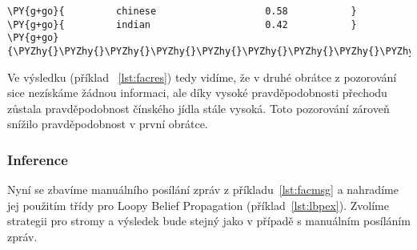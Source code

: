 \begin{example}
\begin{Verbatim}[commandchars=\\\{\}]
\PY{g+go}{         chinese                   0.58           }
\PY{g+go}{         indian                    0.42           }
\PY{g+go}{\PYZhy{}\PYZhy{}\PYZhy{}\PYZhy{}\PYZhy{}\PYZhy{}\PYZhy{}\PYZhy{}\PYZhy{}\PYZhy{}\PYZhy{}\PYZhy{}\PYZhy{}\PYZhy{}\PYZhy{}\PYZhy{}\PYZhy{}\PYZhy{}\PYZhy{}\PYZhy{}\PYZhy{}\PYZhy{}\PYZhy{}\PYZhy{}\PYZhy{}\PYZhy{}\PYZhy{}\PYZhy{}\PYZhy{}\PYZhy{}\PYZhy{}\PYZhy{}\PYZhy{}\PYZhy{}\PYZhy{}\PYZhy{}\PYZhy{}\PYZhy{}\PYZhy{}\PYZhy{}\PYZhy{}\PYZhy{}\PYZhy{}\PYZhy{}\PYZhy{}\PYZhy{}\PYZhy{}\PYZhy{}\PYZhy{}\PYZhy{}}
\end{Verbatim}
\caption{Výsledek inference}
\label{lst:facres}
\end{example}


Ve výsledku (příklad ~\ref{lst:facres}) tedy vidíme, že v druhé obrátce z pozorování sice nezískáme žádnou informaci, ale díky vysoké pravděpodobnosti přechodu zůstala pravděpodobnost čínského jídla stále vysoká.
Toto pozorování zároveň snížilo pravděpodobnost v první obrátce.

\subsubsection{Inference}

Nyní se zbavíme manuálního posílání zpráv z příkladu~\ref{lst:facmsg} a nahradíme jej použitím třídy pro Loopy Belief Propagation (příklad~\ref{lst:lbpex}). 
Zvolíme strategii pro stromy a výsledek bude stejný jako v případě s manuálním posíláním zpráv.

